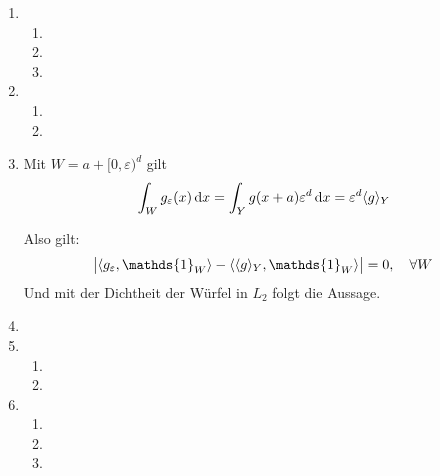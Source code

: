 \documentclass[a4paper,11pt]{scrartcl}
\newcommand*{\eps}{\varepsilon}
\newcommand*{\dx}{\dif{}x}
\newcommand*{\iW}{\mathds{1}_W}
\begin{document}
\begin{enumerate}[label*=\textbf{11.\arabic*.}]

\item
  \begin{enumerate}
  \item
  \item
  \item
  \end{enumerate}


\item
  \begin{enumerate}
  \item
  \item
  \end{enumerate}


\item
  Mit $W = a + [0, \eps)^d$ gilt
  \[ \int_W g_\eps(x) \dx  = \int_Y g(x + a) \eps^d \dx = \eps^d \langle g \rangle_Y \]

  Also gilt:
  \[\abs{\langle g_\eps, \iW \rangle - \langle \langle g \rangle_Y, \iW
      \rangle} = 0, \quad \forall W\]
  Und mit der Dichtheit der Würfel in $L_2$ folgt die Aussage.


\item


\item
  \begin{enumerate}
  \item
  \item
  \end{enumerate}


\item
  \begin{enumerate}
  \item
  \item
  \item
  \end{enumerate}

\end{enumerate}
\end{document}
